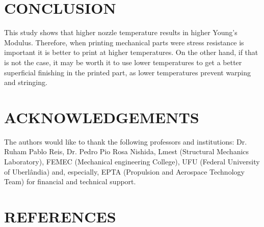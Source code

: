 \documentclass[10pt,fleqn,a4paper,twoside]{article}
\begin{document}
\section{CONCLUSION}
This study shows that higher nozzle temperature results in higher Young's Modulus. Therefore, when printing mechanical parts were stress resistance is important it is better to print at higher temperatures. On the other hand, if that is not the case, it may be worth it to use lower temperatures to get a better superficial finishing in the printed part, as lower temperatures prevent warping and stringing. 








\section{ACKNOWLEDGEMENTS}
The authors would like to thank the following professors and institutions: Dr. Ruham Pablo Reis, Dr. Pedro Pio Rosa Nishida, Lmest (Structural Mechanics Laboratory), FEMEC (Mechanical engineering College), UFU (Federal University of Uberl\^andia) and, especially, EPTA (Propulsion and Aerospace Technology Team) for financial and technical support.




\section{REFERENCES} 


\renewcommand{\refname}{}

\end{document}
